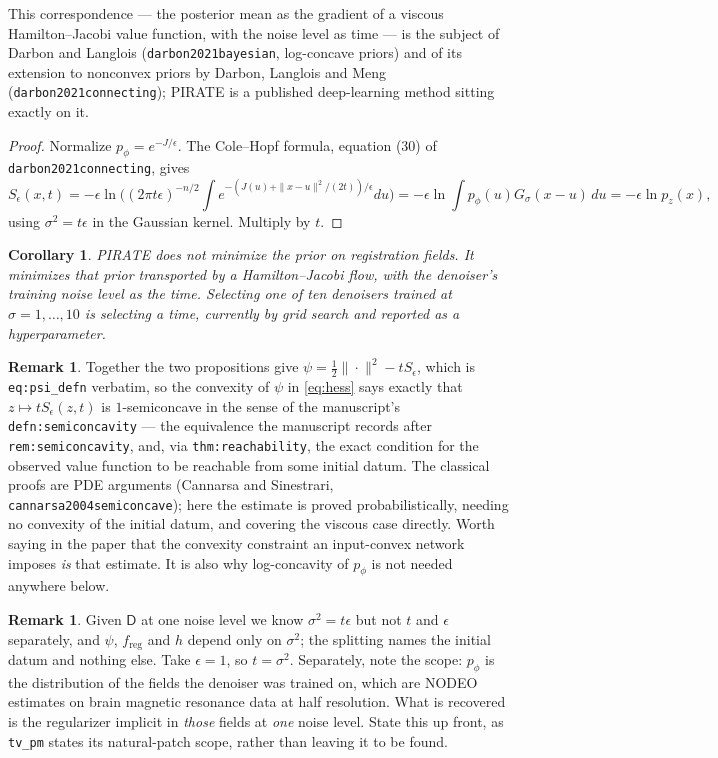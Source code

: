 \documentclass[11pt]{article}
\newtheorem{corollary}[proposition]{Corollary}
\theoremstyle{definition}
\newtheorem{remark}[proposition]{Remark}
\newcommand{\D}{\mathsf{D}}
\newcommand{\freg}{f_{\mathrm{reg}}}
\newcommand{\code}[1]{\texttt{#1}}
\begin{document}
This correspondence — the posterior mean as the gradient of a viscous Hamilton--Jacobi value function, with the noise level as time — is the subject of Darbon and Langlois (\code{darbon2021bayesian}, log-concave priors) and of its extension to nonconvex priors by Darbon, Langlois and Meng (\code{darbon2021connecting}); PIRATE is a published deep-learning method sitting exactly on it.

\begin{proof}
Normalize $p_\phi = e^{-J/\epsilon}$. The Cole--Hopf formula, equation (30) of \code{darbon2021connecting}, gives
\[
S_\epsilon(x,t) = -\epsilon\ln\Big( (2\pi t\epsilon)^{-n/2}\!\!\int e^{-(J(u) + \|x-u\|^2/(2t))/\epsilon}du \Big) = -\epsilon\ln\!\int p_\phi(u)G_\sigma(x-u)\,du = -\epsilon\ln p_z(x),
\]
using $\sigma^2 = t\epsilon$ in the Gaussian kernel. Multiply by $t$.
\end{proof}

\begin{corollary}
\label{cor:time}
PIRATE does not minimize the prior on registration fields. It minimizes that prior transported by a Hamilton--Jacobi flow, with the denoiser's training noise level as the time. Selecting one of ten denoisers trained at $\sigma=1,\dots,10$ is selecting a time, currently by grid search and reported as a hyperparameter.
\end{corollary}

\begin{remark}
\label{rem:consistency}
Together the two propositions give $\psi = \tfrac12\|\cdot\|^2 - tS_\epsilon$, which is \code{eq:psi\_defn} verbatim, so the convexity of $\psi$ in \eqref{eq:hess} says exactly that $z \mapsto tS_\epsilon(z,t)$ is $1$-semiconcave in the sense of the manuscript's \code{defn:semiconcavity} — the equivalence the manuscript records after \code{rem:semiconcavity}, and, via \code{thm:reachability}, the exact condition for the observed value function to be reachable from some initial datum. The classical proofs are PDE arguments (Cannarsa and Sinestrari, \code{cannarsa2004semiconcave}); here the estimate is proved probabilistically, needing no convexity of the initial datum, and covering the viscous case directly. Worth saying in the paper that the convexity constraint an input-convex network imposes \emph{is} that estimate. It is also why log-concavity of $p_\phi$ is not needed anywhere below.
\end{remark}

\begin{remark}
\label{rem:dof}
Given $\D$ at one noise level we know $\sigma^2 = t\epsilon$ but not $t$ and $\epsilon$ separately, and $\psi$, $\freg$ and $h$ depend only on $\sigma^2$; the splitting names the initial datum and nothing else. Take $\epsilon=1$, so $t=\sigma^2$. Separately, note the scope: $p_\phi$ is the distribution of the fields the denoiser was trained on, which are NODEO estimates on brain magnetic resonance data at half resolution. What is recovered is the regularizer implicit in \emph{those} fields at \emph{one} noise level. State this up front, as \code{tv\_pm} states its natural-patch scope, rather than leaving it to be found.
\end{remark}
\end{document}
